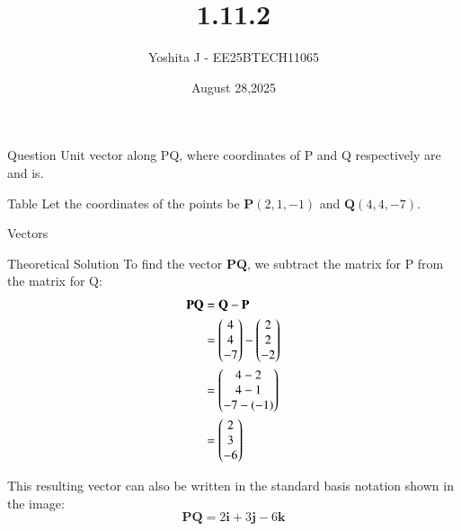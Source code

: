 \documentclass{beamer}
\begin{document}
\title 
{1.11.2}
\date{August 28,2025}


\author 
{Yoshita J - EE25BTECH11065}






\frame{\titlepage}
\begin{frame}{Question}
  Unit vector along PQ, where coordinates of P and Q respectively are  and  is.\\
\end{frame}



\begin{frame}{Table}
Let the coordinates of the points be $\mathbf{P}(2, 1, -1)$ and $\mathbf{Q}(4, 4, -7)$.
\begin{table}[H]    
  \centering
  
  \caption{Vectors}
  \label{Answers}
\end{table}
\end{frame}
\begin{frame}{Theoretical Solution}
To find the vector \(\mathbf{PQ}\), we subtract the matrix for P from the matrix for Q:
\begin{align}
    \mathbf{PQ} &= \mathbf{Q} - \mathbf{P} \\
    &= 
   \begin{pmatrix}4\\4\\-7\end{pmatrix}
    -
    \begin{pmatrix}2\\2\\-2\end{pmatrix} \\
    &= 
    \begin{pmatrix}4-2\\4-1\\-7-(-1)\end{pmatrix} \\
    &= 
    \begin{pmatrix}2\\3\\-6\end{pmatrix}
\end{align}

This resulting vector can also be written in the standard basis notation shown in the image:
\[
\mathbf{PQ} = 2\mathbf{i} + 3\mathbf{j} - 6\mathbf{k}
\]
\end{frame}
\end{document}
